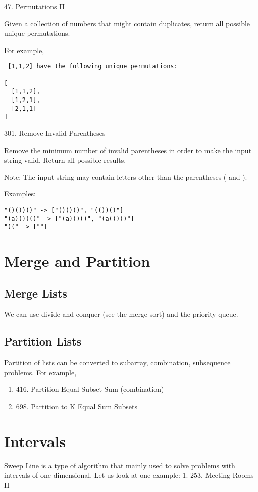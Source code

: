 \documentclass[../main.tex]{subfiles}
\begin{document}
47. Permutations II

Given a collection of numbers that might contain duplicates, return all possible unique permutations.

For example,
\begin{lstlisting}
 [1,1,2] have the following unique permutations:

[
  [1,1,2],
  [1,2,1],
  [2,1,1]
]
\end{lstlisting}

301. Remove Invalid Parentheses

Remove the minimum number of invalid parentheses in order to make the input string valid. Return all possible results.

Note: The input string may contain letters other than the parentheses ( and ).

Examples:
\begin{lstlisting}
"()())()" -> ["()()()", "(())()"]
"(a)())()" -> ["(a)()()", "(a())()"]
")(" -> [""]
\end{lstlisting}


\section{Merge and Partition}
\subsection{Merge Lists}
We can use divide and conquer (see the merge sort) and the priority queue.
\subsection{Partition Lists}
Partition of lists can be converted to subarray, combination, subsequence problems. For example, 
\begin{enumerate}
    \item 416. Partition Equal Subset Sum (combination)
    \item 698. Partition to K Equal Sum Subsets
\end{enumerate} 

\section{Intervals}
\label{sec_sweep_line}
Sweep Line is a type of algorithm that mainly used to solve problems with intervals of one-dimensional. Let us look at one example:
1. 253. Meeting Rooms II
\end{document}
